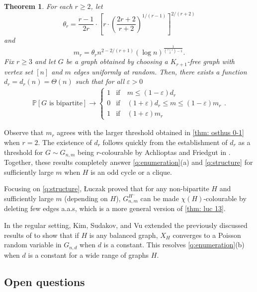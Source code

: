 \documentclass[11pt]{article}
\newcommand{\eps}{\varepsilon}
\def\P{\mathbb P}
\theoremstyle{plain}
\newtheorem{thm}{Theorem}[section]
\begin{document}
\begin{thm}\label{thm: cliques}\cite{BaloghMorrisSamotijWarnke2016TypicalStructure}
     For each $r \geq 2$, let 
    \[
    \theta_r = \frac{r-1}{2r}\cdot\left[r\cdot\left(\frac{2r+2}{r+2}\right)^{1/(r-1)}\right]^{2/(r+2)}
    \]
    and 
    \[
    m_r = \theta_rn^{2-2/(r+1)}(\log n)^{\frac{1}{\binom{r+1}{2}-1}}.
    \]
    Fix $r \geq 3$ and let $G$ be a graph obtained by choosing a $K_{r+1}$-free graph with vertex set $[n]$ and $m$ edges uniformly at random. Then, there exists a function $d_r = d_r(n) = \Theta(n)$ such that for all $\eps > 0$
    \begin{align*}
        \P[G \text{ is bipartite}] \rightarrow \begin{cases}
            1 &\text{if} \quad m \leq (1 - \eps)d_r\\
            0 &\text{if} \quad (1 + \eps)d_r \leq m \leq (1 - \eps)m_r\\
            1 &\text{if}\quad (1 + \eps)m_r
        \end{cases}
        .
    \end{align*}
\end{thm}
Observe that $m_r$ agrees with the larger threshold obtained in \cref{thm: osthus 0-1} when $r = 2$. The existence of $d_r$ follows quickly from the establishment of $d_r$ as a threshold for $G \sim G_{n,m}$ being $r$-colourable by Achlioptas and Friedgut in \cite{Achlioptas1999SharpThreshold}. Together, these results completely answer \cref{q:enumeration}(a) and \cref{q:structure} for sufficiently large $m$ when $H$ is an odd cycle or a clique.

Focusing on \cref{q:structure}, {\L}uczak \cite{luczak2000triangle} proved that for any non-bipartite $H$ and sufficiently large $m$ (depending on $H$), $G_{n,m}^{H^-}$ can be made $\chi(H)$-colourable by deleting few edges a.a.s, which is a more general version of \cref{thm: luc 13}.

In the regular setting, Kim, Sudakov, and Vu \cite{KimSudakovVu2007} extended the previously discussed results of \cite{Bollobas1980,Wormald1978,Wormald1981} to 
 show that if $H$ is any balanced graph, $X_H$ converges to a Poisson random variable in $G_{n,d}$ when $d$ is a constant. This resolves \cref{q:enumeration}(b) when $d$ is a constant for a wide range of graphs $H$.
\subsection{Open questions}
\end{document}
